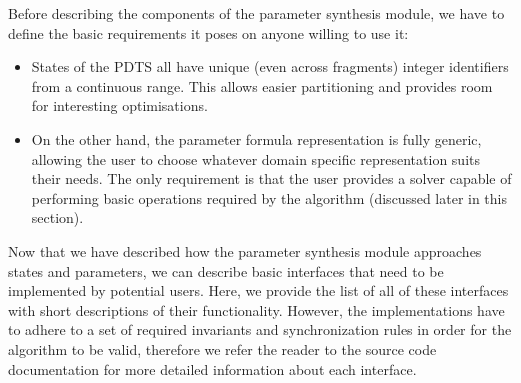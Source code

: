 Before describing the components of the parameter synthesis module, we have to define the basic requirements it poses on anyone willing to use it:

\begin{itemize}
	\item States of the \ac{PDTS} all have unique (even across fragments) integer identifiers from a continuous range. This allows easier partitioning and provides room for interesting optimisations.
	\item On the other hand, the parameter formula representation is fully generic, allowing the user to choose whatever domain specific representation suits their needs. The only requirement is that the user provides a solver capable of performing basic operations required by the algorithm (discussed later in this section).
\end{itemize}

Now that we have described how the parameter synthesis module approaches states and parameters, we can describe basic interfaces that need to be implemented by potential users. Here, we provide the list of all of these interfaces with short descriptions of their functionality. However, the implementations have to adhere to a set of required invariants and synchronization rules in order for the algorithm to be valid, therefore we refer the reader to the source code documentation for more detailed information about each interface.

